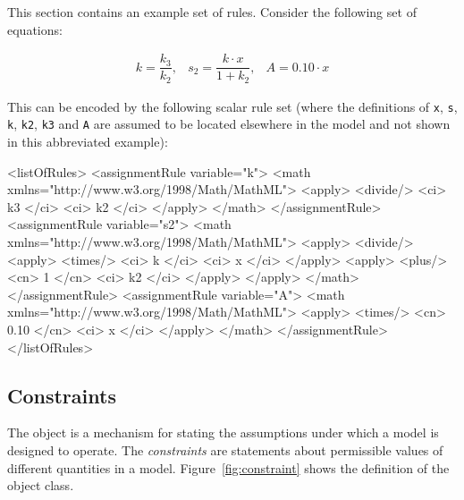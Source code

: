This section contains an example set of rules.  Consider the
following set of equations:
\begin{linenomath}
  \begin{equation*}
    \begin{array}{lll}
      k = \dfrac{k_3}{k_2}, & s_2 = \dfrac{k \cdot x}{1 + k_2}, & A = 0.10 \cdot x
    \end{array}
  \end{equation*}
\end{linenomath}
This can be encoded by the following scalar rule set (where the
definitions of \texttt{x}, \texttt{s}, \texttt{k}, \texttt{k2},
\texttt{k3} and \texttt{A} are assumed to be located elsewhere in
the model and not shown in this abbreviated example):

\begin{example}
<listOfRules>
    <assignmentRule variable="k">
        <math xmlns="http://www.w3.org/1998/Math/MathML">
            <apply> <divide/> <ci> k3 </ci> <ci> k2 </ci> </apply>
        </math>
    </assignmentRule>
    <assignmentRule variable="s2">
        <math xmlns="http://www.w3.org/1998/Math/MathML">
            <apply>
                <divide/>
                    <apply> <times/> <ci> k </ci> <ci> x </ci> </apply>
                    <apply> <plus/> <cn> 1 </cn> <ci> k2 </ci> </apply>
            </apply>
        </math>
    </assignmentRule>
    <assignmentRule variable="A">
        <math xmlns="http://www.w3.org/1998/Math/MathML">
            <apply> <times/> <cn> 0.10 </cn> <ci> x </ci> </apply>
        </math>
    </assignmentRule>
</listOfRules>
\end{example}


\subsection{Constraints}
\label{sec:constraints}

The \Constraint object is a mechanism for stating the
assumptions under which a model is designed to operate.  The
\emph{constraints} are statements about permissible values of
different quantities in a model.  Figure~\ref{fig:constraint}
shows the definition of the \Constraint object class.

